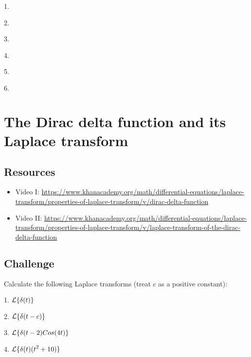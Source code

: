 1.\\

2.\\


3.\\

4.\\


5.\\

6.\\



\iffalse
\newpage
\section{The Dirac delta function and its Laplace transform}

\subsection*{Resources}
\begin{itemize}
    \item Video I: \url{https://www.khanacademy.org/math/differential-equations/laplace-transform/properties-of-laplace-transform/v/dirac-delta-function}
    \item Video II: \url{https://www.khanacademy.org/math/differential-equations/laplace-transform/properties-of-laplace-transform/v/laplace-transform-of-the-dirac-delta-function}
\end{itemize}

\subsection*{Challenge}
Calculate the following Laplace transforms (treat $c$ as a positive constant):

1. $\displaystyle \mathcal{L}\{\delta(t)\}$

2. $\displaystyle \mathcal{L}\{\delta(t-c)\}$

3. $\displaystyle \mathcal{L}\{\delta(t-2) Cos(4 t)\}$

4. $\displaystyle \mathcal{L}\{\delta(t) (t^2+10)\}$


